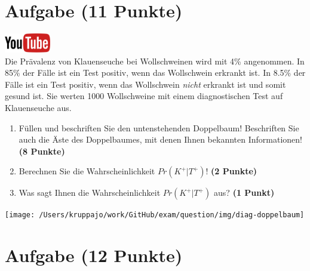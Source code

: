 \documentclass[a4paper, 9pt]{scrartcl}\usepackage[]{graphicx}\usepackage[]{xcolor}
\begin{document}
\clearpage

\section{Aufgabe \hfill (11 Punkte)}

\hfill\href{https://youtu.be/VQlNl8hvRII}{\includegraphics[width =
  2cm]{img/youtube}}\\[1Ex]


Die Pr{\"a}valenz von Klauenseuche bei Wollschweinen wird mit
4\% angenommen. In 85\% der F{\"a}lle ist ein Test positiv, wenn das Wollschwein erkrankt
ist. In 8.5\% der F{\"a}lle ist ein Test positiv,
wenn das Wollschwein \textit{nicht} erkrankt ist und somit gesund ist. Sie
werten 1000 Wollschweine mit einem
diagnostischen Test auf Klauenseuche aus.



\begin{enumerate}
\item F{\"u}llen und beschriften Sie den untenstehenden Doppelbaum! Beschriften
  Sie auch die {\"A}ste des Doppelbaumes, mit denen Ihnen bekannten
  Informationen!  \textbf{(8 Punkte)}
\item Berechnen Sie die Wahrscheinlichkeit $Pr(K^+|T^+)$! \textbf{(2 Punkte)}
\item Was sagt Ihnen die Wahrscheinlichkeit $Pr(K^+|T^+)$ aus? \textbf{(1 Punkt)}
\end{enumerate}

\vspace{1cm}

\begin{center}
  \texttt{[image: /Users/kruppajo/work/GitHub/exam/question/img/diag-doppelbaum]}
\end{center}



 
\clearpage

\section{Aufgabe \hfill (12 Punkte)}
\end{document}

